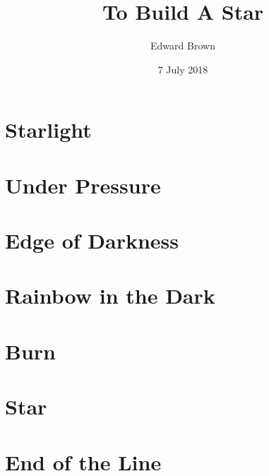 \documentclass[profonts,stix,symmetric]{astro-bookshelf}
\title{To Build A Star}
\author{Edward Brown}
\date{7 July 2018}
\begin{document}
\frontmatter
{}


\mainmatter
{}
\setcounter{page}{1}

\chapter{Starlight}\label{ch.starlight}


\chapter{Under Pressure}\label{ch.basic-stellar-properties}


\chapter{Edge of Darkness}\label{ch.radiative-transport}


\chapter{Rainbow in the Dark}\label{ch.classifying-stars}


\chapter{Burn}\label{ch.nuclear-burning}


%

\chapter{Star}\label{ch.main-sequence}


\chapter{End of the Line}\label{ch.post-main-sequence}



\backmatter


\end{document}
